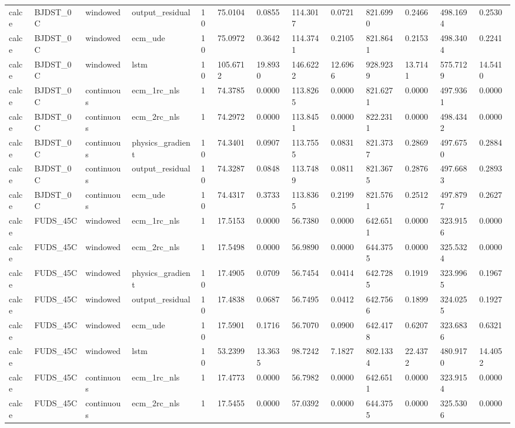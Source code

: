 \begin{tabular}{lllllllllllll}
calce & BJDST\_0C & windowed & output\_residual & 10 & 75.0104 & 0.0855 & 114.3017 & 0.0721 & 821.6990 & 0.2466 & 498.1694 & 0.2530 \\
calce & BJDST\_0C & windowed & ecm\_ude & 10 & 75.0972 & 0.3642 & 114.3741 & 0.2105 & 821.8641 & 0.2153 & 498.3404 & 0.2241 \\
calce & BJDST\_0C & windowed & lstm & 10 & 105.6712 & 19.8930 & 146.6222 & 12.6966 & 928.9239 & 13.7141 & 575.7129 & 14.5410 \\
calce & BJDST\_0C & continuous & ecm\_1rc\_nls & 1 & 74.3785 & 0.0000 & 113.8265 & 0.0000 & 821.6271 & 0.0000 & 497.9361 & 0.0000 \\
calce & BJDST\_0C & continuous & ecm\_2rc\_nls & 1 & 74.2972 & 0.0000 & 113.8451 & 0.0000 & 822.2311 & 0.0000 & 498.4342 & 0.0000 \\
calce & BJDST\_0C & continuous & physics\_gradient & 10 & 74.3401 & 0.0907 & 113.7555 & 0.0831 & 821.3737 & 0.2869 & 497.6750 & 0.2884 \\
calce & BJDST\_0C & continuous & output\_residual & 10 & 74.3287 & 0.0848 & 113.7489 & 0.0811 & 821.3675 & 0.2876 & 497.6683 & 0.2893 \\
calce & BJDST\_0C & continuous & ecm\_ude & 10 & 74.4317 & 0.3733 & 113.8365 & 0.2199 & 821.5761 & 0.2512 & 497.8797 & 0.2627 \\
calce & FUDS\_45C & windowed & ecm\_1rc\_nls & 1 & 17.5153 & 0.0000 & 56.7380 & 0.0000 & 642.6511 & 0.0000 & 323.9156 & 0.0000 \\
calce & FUDS\_45C & windowed & ecm\_2rc\_nls & 1 & 17.5498 & 0.0000 & 56.9890 & 0.0000 & 644.3755 & 0.0000 & 325.5324 & 0.0000 \\
calce & FUDS\_45C & windowed & physics\_gradient & 10 & 17.4905 & 0.0709 & 56.7454 & 0.0414 & 642.7285 & 0.1919 & 323.9965 & 0.1967 \\
calce & FUDS\_45C & windowed & output\_residual & 10 & 17.4838 & 0.0687 & 56.7495 & 0.0412 & 642.7566 & 0.1899 & 324.0255 & 0.1927 \\
calce & FUDS\_45C & windowed & ecm\_ude & 10 & 17.5901 & 0.1716 & 56.7070 & 0.0900 & 642.4178 & 0.6207 & 323.6836 & 0.6321 \\
calce & FUDS\_45C & windowed & lstm & 10 & 53.2399 & 13.3635 & 98.7242 & 7.1827 & 802.1334 & 22.4372 & 480.9170 & 14.4052 \\
calce & FUDS\_45C & continuous & ecm\_1rc\_nls & 1 & 17.4773 & 0.0000 & 56.7982 & 0.0000 & 642.6511 & 0.0000 & 323.9154 & 0.0000 \\
calce & FUDS\_45C & continuous & ecm\_2rc\_nls & 1 & 17.5455 & 0.0000 & 57.0392 & 0.0000 & 644.3755 & 0.0000 & 325.5306 & 0.0000 \\

\end{tabular}

